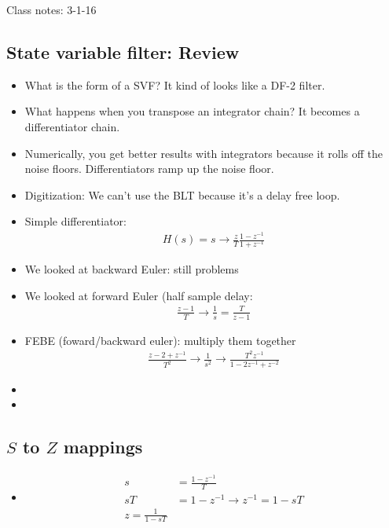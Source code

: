 Class notes: 3-1-16
\subsection*{State variable filter: Review}
\begin{itemize}
\item{What is the form of a SVF? It kind of looks like a DF-2 filter.}
\item{What happens when you transpose an integrator chain? It becomes a differentiator chain. }
\item{Numerically, you get better results with integrators because it rolls off the noise floors.
Differentiators ramp up the noise floor.
}
\item{Digitization: We can't use the BLT because it's a delay free loop.}
\item{Simple differentiator:
    \begin{align*}
    H(s) = s \rightarrow
    \frac{z}{T} \frac{1 - z^{-1}}{1 + z^{-1}}
    \end{align*}
}
\item{We looked at backward Euler: still problems}
\item{We looked at forward Euler (half sample delay:
    \begin{align*}
        \frac{z - 1 }{T} \rightarrow \frac{1}{s} = \frac{T}{z - 1}
    \end{align*}
}
\item{FEBE (foward/backward euler): multiply them together
    \begin{align*}
        \frac{z - 2 + z^{-1}}{T^2} 
        \rightarrow 
        \frac{1}{s^2} 
        \rightarrow 
        \frac{T^2 z^{-1}}{1 - 2z^{-1} + z^{-2}}
    \end{align*}
}
\item{}
\item{}
\end{itemize}

\subsection*{$S$ to $Z$ mappings}
\begin{itemize}
\item{
\begin{align*}
s &= \frac{1 - z^{-1}}{T}\\
sT &= 1 - z^{-1} \rightarrow z^{-1} = 1 - sT\\
z = \frac{1}{1 - sT}
\end{align*}
}
\end{itemize}

